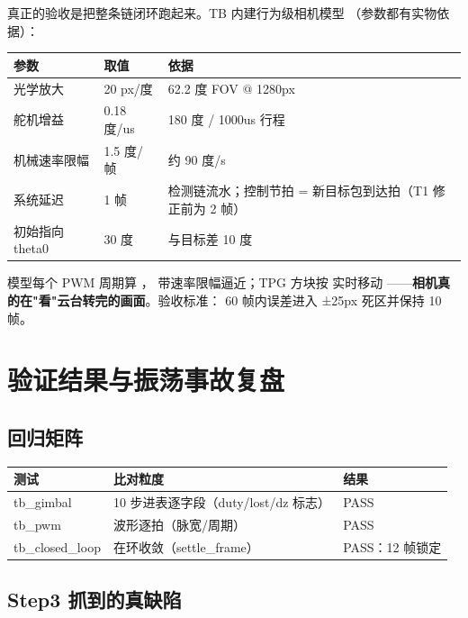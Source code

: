 真正的验收是把整条链闭环跑起来。TB 内建行为级相机模型
（参数都有实物依据）：

\begin{center}
\begin{tabular}{lll}
\toprule
\rowcolor{rowtint}\textbf{参数} & \textbf{取值} & \textbf{依据} \\
\midrule
光学放大 & 20 px/度 & 62.2 度 FOV @ 1280px \\
舵机增益 & 0.18 度/us & 180 度 / 1000us 行程 \\
机械速率限幅 & 1.5 度/帧 & 约 90 度/s \\
系统延迟 & 1 帧 & 检测链流水；控制节拍 = 新目标包到达拍（T1 修正前为 2 帧） \\
初始指向 theta0 & 30 度 & 与目标差 10 度 \\
\bottomrule
\end{tabular}
\end{center}

模型每个 PWM 周期算 ，
带速率限幅逼近；TPG 方块按  实时移动
——\textbf{相机真的在"看"云台转完的画面}。验收标准：
60 帧内误差进入 ±25px 死区并保持 10 帧。

\section{验证结果与振荡事故复盘}

\subsection{回归矩阵}

\begin{center}
\begin{tabular}{lll}
\toprule
\rowcolor{rowtint}\textbf{测试} & \textbf{比对粒度} & \textbf{结果} \\
\midrule
tb\_gimbal & 10 步进表逐字段（duty/lost/dz 标志） & PASS \\
tb\_pwm & 波形逐拍（脉宽/周期） & PASS \\
tb\_closed\_loop & 在环收敛（settle\_frame） & PASS：12 帧锁定 \\
\bottomrule
\end{tabular}
\end{center}

\subsection{Step3 抓到的真缺陷}

